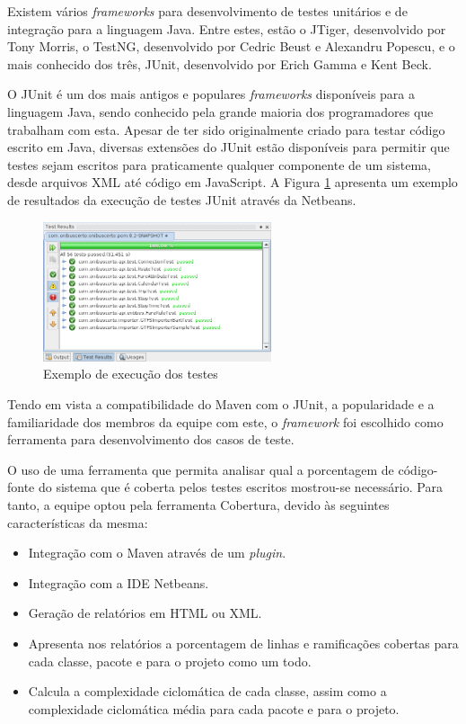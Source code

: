 Existem vários \emph{frameworks} para desenvolvimento de testes unitários e de integração para a linguagem Java.
Entre estes, estão o JTiger, desenvolvido por Tony Morris, o TestNG, desenvolvido por Cedric Beust e Alexandru Popescu, e o mais conhecido dos três, JUnit, desenvolvido por Erich Gamma e Kent Beck.

O JUnit é um dos mais antigos e populares \emph{frameworks} disponíveis para a linguagem Java, sendo conhecido pela grande maioria dos programadores que trabalham com esta.
Apesar de ter sido originalmente criado para testar código escrito em Java, diversas extensões do JUnit estão disponíveis para permitir que testes sejam escritos para praticamente qualquer componente de um sistema, desde arquivos XML até código em JavaScript.
A Figura \ref{fig:testes} apresenta um exemplo de resultados da execução de testes JUnit através da  Netbeans.
\begin{figure}[!htb]
	\centering
	\includegraphics[width=0.6\textwidth]{./imgs/testes.png}
	\caption[Exemplo de execução dos testes]{Exemplo de execução dos testes}
	\label{fig:testes}
\end{figure}

Tendo em vista a compatibilidade do Maven com o JUnit, a popularidade e a familiaridade dos membros da equipe com este, o \emph{framework} foi escolhido como ferramenta para desenvolvimento dos casos de teste.

O uso de uma ferramenta que permita analisar qual a porcentagem de código-fonte do sistema que é coberta pelos testes escritos mostrou-se necessário.
Para tanto, a equipe optou pela ferramenta Cobertura, devido às seguintes características da mesma:

\begin{itemize}
	\item Integração com o Maven através de um \emph{plugin}.
	\item Integração com a IDE Netbeans.
	\item Geração de relatórios em HTML ou XML.
	\item Apresenta nos relatórios a porcentagem de linhas e ramificações cobertas para cada classe, pacote e para o projeto como um todo.
	\item Calcula a complexidade ciclomática de cada classe, assim como a complexidade ciclomática média para cada pacote e para o projeto.
\end{itemize}

